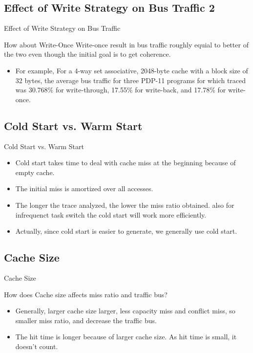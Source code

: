 \documentclass{beamer}
\begin{document}
\subsection{Effect of Write Strategy on Bus Traffic 2}
\begin{frame}{Effect of Write Strategy on Bus Traffic}
	\begin{block}{How about Write-Once}
		Write-once result  in bus traffic roughly equial to better of the two even though the initial goal is to get coherence.
	\end{block}
	\begin{itemize}
		\item{For example, For a 4-way set associative, 2048-byte cache with a block size of 32 bytes, the average bus traffic for three PDP-11 programs for which traced was 30.768\% for write-through, 17.55\% for write-back, and 17.78\% for write-once.}
	\end{itemize}
\end{frame}

\subsection{Cold Start vs. Warm Start}
\begin{frame}{Cold Start vs. Warm Start}
	\begin{itemize}
		\item	{Cold start takes time to deal with cache miss at the beginning because of empty cache.}
		\item  {The initial miss is amortized over all accesses. }
		\item {The longer the trace analyzed, the lower the miss ratio obtained. also for infrequenct task switch the cold start will work more efficiently. }
		\item {Actually, since cold start is easier to generate, we generally use cold start.}
	\end{itemize}
\end{frame}

\subsection{Cache Size}
\begin{frame}{Cache Size}
	\begin{block}{How does Cache size affects miss ratio and traffic bus?}
	\end{block}
	\begin{itemize}
		\item {Generally, larger cache size larger, less capacity miss and conflict miss, so smaller miss ratio, and decrease the traffic bus. }
		\item {The hit time is longer because of larger cache size. As hit time is small, it doesn't count.}	
	\end{itemize}
\end{frame}
\end{document}
